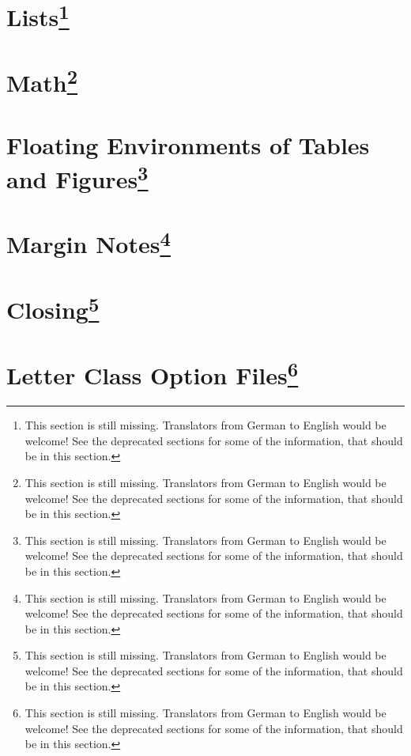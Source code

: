 \section{Lists\protect\footnote{This section is still missing. Translators
    from German to English would be welcome! See the deprecated sections for
    some of the information, that should be in this section.}}
\label{sec:scrlttr2.stillmissing}
\mbox{}

\section{Math\protect\footnote{This section is still missing. Translators
    from German to English would be welcome! See the deprecated sections for
    some of the information, that should be in this section.}}
\label{sec:scrlttr2.stillmissing}
\mbox{}

\section{Floating Environments of Tables and Figures\protect\footnote{This section is still missing. Translators
    from German to English would be welcome! See the deprecated sections for
    some of the information, that should be in this section.}}
\label{sec:scrlttr2.stillmissing}
\mbox{}

\section{Margin Notes\protect\footnote{This section is still missing. Translators
    from German to English would be welcome! See the deprecated sections for
    some of the information, that should be in this section.}}
\label{sec:scrlttr2.stillmissing}
\mbox{}

\section{Closing\protect\footnote{This section is still missing. Translators
    from German to English would be welcome! See the deprecated sections for
    some of the information, that should be in this section.}}
\label{sec:scrlttr2.stillmissing}
\mbox{}

\section{Letter Class Option Files\protect\footnote{This section is still missing. Translators
    from German to English would be welcome! See the deprecated sections for
    some of the information, that should be in this section.}}
\label{sec:scrlttr2.stillmissing}
\mbox{}

